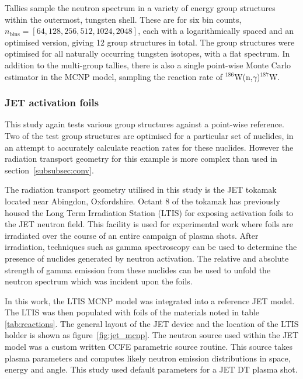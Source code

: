 Tallies sample the neutron spectrum in a variety of energy group structures within the outermost, tungsten shell. These are for six bin counts, $n_\mathrm{bins} = [64,128,256,512,1024,2048]$, each with a logarithmically spaced and an optimised version, giving 12 group structures in total. The group structures were optimised for all naturally occurring tungsten isotopes, with a flat spectrum. In addition to the multi-group tallies, there is also a single point-wise Monte Carlo estimator in the MCNP model, sampling the reaction rate of $^{186}$W(n,$\gamma$)$^{187}$W.

\subsubsection{JET activation foils}
\label{subsubsec:jet}
This study again tests various group structures against a point-wise reference. Two of the test group structures are optimised for a particular set of nuclides, in an attempt to accurately calculate reaction rates for these nuclides. However the radiation transport geometry for this example is more complex than used in section~\ref{subsubsec:conv}. 

The radiation transport geometry utilised in this study is the JET tokamak located near Abingdon, Oxfordshire. Octant 8 of the tokamak has previously housed the Long Term Irradiation Station (LTIS) for exposing activation foils to the JET neutron field. This facility is used for experimental work where foils are irradiated over the course of an entire campaign of plasma shots. After irradiation, techniques such as gamma spectroscopy can be used to determine the presence of nuclides generated by neutron activation. The relative and absolute strength of gamma emission from these nuclides can be used to unfold the neutron spectrum which was incident upon the foils.

In this work, the LTIS MCNP model \cite{lengar2017} was integrated into a reference JET model. The LTIS was then populated with foils of the materials noted in table \ref{tab:reactions}. The general layout of the JET device and the location of the LTIS holder is shown as figure~\ref{fig:jet_mcnp}. The neutron source used within the JET model was a custom written CCFE parametric source routine. This source takes plasma parameters and computes likely neutron emission distributions in space, energy and angle. This study used default parameters for a JET DT plasma shot.

